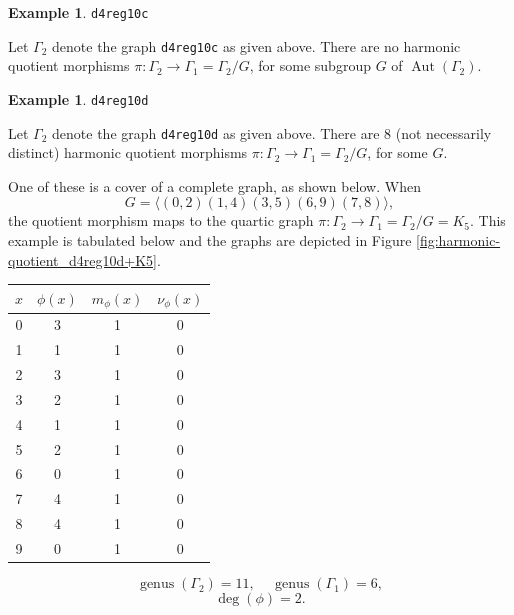 \documentclass[12pt,letterpaper]{article}
\theoremstyle{definition}
\newtheorem{example}[theorem]{Example}
\DeclareMathOperator{\Aut}{Aut}
\DeclareMathOperator{\genus}{genus}
\begin{document}
\begin{example}%
\label{example:d4reg10c}
 {\tt d4reg10c}\newline
{\rm  
  Let $\Gamma_2$ denote the graph {\tt d4reg10c} as given above.
There are no harmonic quotient morphisms
$\pi: \Gamma_2\to \Gamma_1=\Gamma_2/G$,
for some subgroup $G$ of $\Aut(\Gamma_2)$.

}
\end{example}


\begin{example}%
\label{example:d4reg10d}
 {\tt d4reg10d}\newline
{\rm  
  Let $\Gamma_2$ denote the graph {\tt d4reg10d} as given above.
There are $8$ (not necessarily distinct) harmonic quotient morphisms
$\pi: \Gamma_2\to \Gamma_1=\Gamma_2/G$, for some $G$. 

One of these is a cover of a complete graph, as shown below.
When
\[
G = \langle (0,2)(1,4)(3,5)(6,9)(7,8) \rangle ,
\]
the quotient morphism maps to the quartic graph
$\pi: \Gamma_2\to \Gamma_1=\Gamma_2/G = K_5$. This example
is tabulated below and the graphs are depicted in
Figure \ref{fig:harmonic-quotient_d4reg10d+K5}.

\begin{center}
\begin{tabular}{c|c|c|c}  
  $x$ & $\phi(x)$ & $m_\phi(x)$ & $\nu_\phi(x)$ \\ \hline
  0   &    3   &        1         &  0   \\ 
  1   &    1   &        1         &  0  \\ 
  2   &    3   &        1         &  0  \\ 
  3   &    2   &        1         &  0  \\ 
  4   &    1   &        1         &  0   \\
  5   &    2   &        1         &  0   \\
  6   &    0   &        1         &  0   \\
  7   &    4   &        1         &  0   \\
  8   &    4   &        1         &  0   \\
  9   &    0   &        1         &  0   \\     
\end{tabular}
\end{center}

\[
  \genus(\Gamma_2) =11,\ \ \ \ \
  \genus(\Gamma_1) =6,
\]
\[
\deg(\phi) =2.
\]

}
\end{example}
\end{document}
